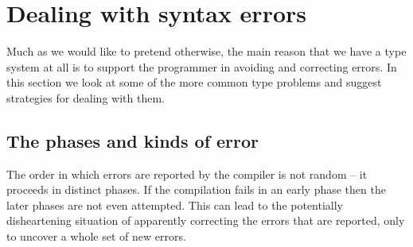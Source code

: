 \section{Dealing with syntax errors}
\label{types:errors}
Much as we would like to pretend otherwise, the main reason that we have a type system at all is to support the programmer in avoiding and correcting errors. In this section we look at some of the more common type problems and suggest strategies for dealing with them.

\subsection{The phases and kinds of error}
The order in which errors are reported by the compiler is not random -- it proceeds in distinct phases. If the compilation fails in an early phase then the later phases are not even attempted. This can lead to the potentially disheartening situation of apparently correcting the errors that are reported, only to uncover a whole set of new errors.


